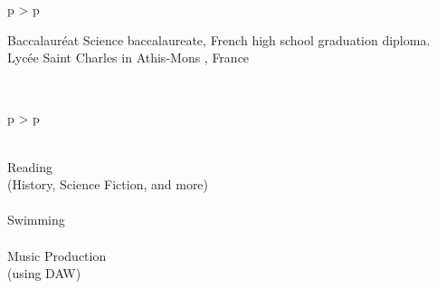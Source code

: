 \documentclass[cv]{cv_style}
\begin{document}
{\begin{tabular}{p{\leftsize\textwidth} > {\arraybackslash}p{\rightsize\textwidth}}
\begin{minipage}[t]{\rightsize\textwidth}
\begin{liste}
                {Baccalauréat}
                {}
                {
                    Science baccalaureate, French high school graduation diploma.
                }
                {
                Lycée Saint Charles in Athis-Mons , France
                    }
        \end{liste}



    \end{minipage}\\
\end{tabular}

\begin{tabular}{p{\leftsize\textwidth} > {\arraybackslash}p{\rightsize\textwidth}}

    \begin{minipage}[t]{\leftsize\textwidth}
        
        \begin{flushright}
            \vspace{-0.3cm}\\
            \small
            Reading\\ 
            (History, Science Fiction, and more) \\
        \vspace{.1cm}\\
                Swimming \\
        \vspace{.1cm}\\
            Music Production \\ 
            (using DAW) 
        \end{flushright}


\end{minipage}
\end{tabular}}
\end{document}
